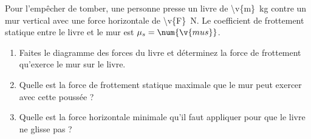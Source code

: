 Pour l'empêcher de tomber, une personne presse un livre de \qty{\v{m}}{kg} contre un mur vertical avec une force horizontale de \qty{\v{F}}{N}. Le coefficient de frottement statique entre le livre et le mur est $\mu_s = \num{\v{mus}}$.

\begin{enumerate}[label=\alph*)]
    \item Faites le diagramme des forces du livre et déterminez la force de frottement qu'exerce le mur sur le livre.
    \item Quelle est la force de frottement statique maximale que le mur peut exercer avec cette poussée ?
    \item Quelle est la force horizontale minimale qu'il faut appliquer pour que le livre ne glisse pas ?
\end{enumerate}
